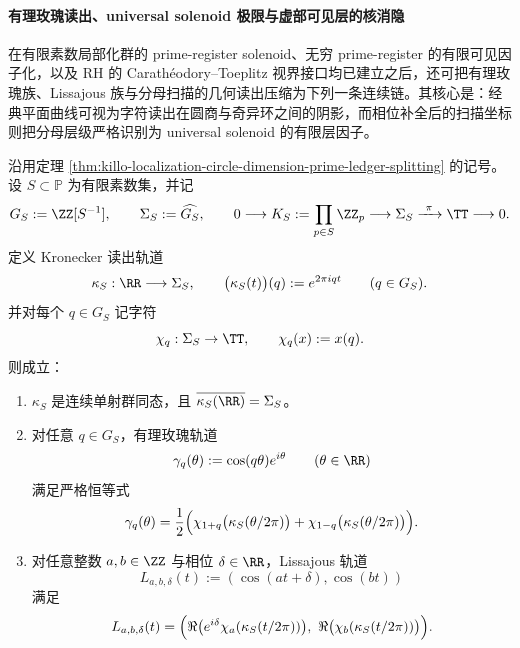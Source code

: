 \paragraph{有理玫瑰读出、universal solenoid 极限与虚部可见层的核消隐}
在有限素数局部化群的 prime-register solenoid、无穷 prime-register 的有限可见因子化，以及 RH 的 Carath\'eodory--Toeplitz 视界接口均已建立之后，还可把有理玫瑰族、Lissajous 族与分母扫描的几何读出压缩为下列一条连续链。其核心是：经典平面曲线可视为字符读出在圆商与奇异环之间的阴影，而相位补全后的扫描坐标则把分母层级严格识别为 universal solenoid 的有限层因子。

\begin{theorem}\label{thm:xi-time-part62d-solenoid-kronecker-rose-lissajous-lift}
沿用定理 \ref{thm:killo-localization-circle-dimension-prime-ledger-splitting} 的记号。设 \(S\subset\mathbb P\) 为有限素数集，并记
\[
G_S:=\ZZ[S^{-1}],
\qquad
\Sigma_S:=\widehat{G_S},
\qquad
0\longrightarrow K_S:=\prod_{p\in S}\ZZ_p
\longrightarrow
\Sigma_S
\xrightarrow{\ \pi\ }
\TT
\longrightarrow 0.
\]
定义 Kronecker 读出轨道
\[
\kappa_S:\RR\longrightarrow \Sigma_S,
\qquad
\bigl(\kappa_S(t)\bigr)(q):=e^{2\pi iqt}
\qquad (q\in G_S).
\]
并对每个 \(q\in G_S\) 记字符
\[
\chi_q:\Sigma_S\to\TT,
\qquad
\chi_q(x):=x(q).
\]
则成立：
\begin{enumerate}
  \item \(\kappa_S\) 是连续单射群同态，且 \(\overline{\kappa_S(\RR)}=\Sigma_S\)。
  \item 对任意 \(q\in G_S\)，有理玫瑰轨道
  \[
  \gamma_q(\theta):=\cos(q\theta)e^{i\theta}
  \qquad (\theta\in\RR)
  \]
  满足严格恒等式
  \[
  \gamma_q(\theta)
  =
  \frac12\Bigl(
  \chi_{1+q}\bigl(\kappa_S(\theta/2\pi)\bigr)
  +
  \chi_{1-q}\bigl(\kappa_S(\theta/2\pi)\bigr)
  \Bigr).
  \]
  \item 对任意整数 \(a,b\in\ZZ\) 与相位 \(\delta\in\RR\)，Lissajous 轨道
  \[
  L_{a,b,\delta}(t):=(\cos(at+\delta),\cos(bt))
  \]
  满足
  \[
  L_{a,b,\delta}(t)
  =
  \Bigl(
  \Re\bigl(e^{i\delta}\chi_a(\kappa_S(t/2\pi))\bigr),\
  \Re\bigl(\chi_b(\kappa_S(t/2\pi))\bigr)
  \Bigr).
  \]
\end{enumerate}
\end{theorem}
